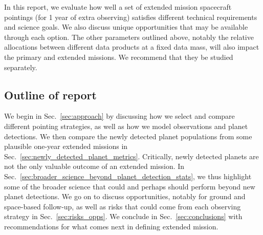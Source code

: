 In this report, we evaluate how well a set of extended mission spacecraft pointings (for 1 year of extra observing) satisfies different technical requirements and science goals. 
We also discuss unique opportunities that may be available through each option.
The other parameters outlined above, notably the relative allocations between different data products at a fixed data mass, will also impact the primary and extended missions. We recommend that they be studied separately.


\subsection{Outline of report}
We begin in Sec.~\ref{sec:approach} by discussing how we select and compare different pointing strategies, as well as how we model \tesss observations and planet detections.
We then compare the newly detected planet populations from some plausible one-year extended missions in Sec.~\ref{sec:newly_detected_planet_metrics}. 
Critically, newly detected planets are not the only valuable outcome of an extended mission. 
In Sec.~\ref{sec:broader_science_beyond_planet_detection_stats}, we thus highlight some of the broader science that \tess could and perhaps should perform beyond new planet detections.
We go on to discuss opportunities, notably for ground and space-based follow-up, as well as risks that could come from each observing strategy in Sec.~\ref{sec:risks_opps}.
We conclude in Sec.~\ref{sec:conclusions} with recommendations for what comes next in defining \tesss extended mission.
